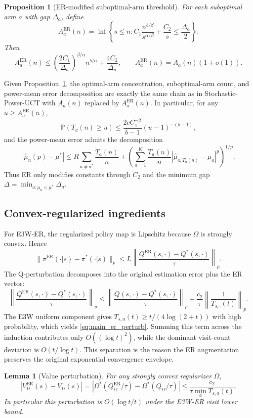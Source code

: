 \documentclass{article}
\newtheorem{lemma}[theorem]{Lemma}
\newtheorem{proposition}[theorem]{Proposition}
\newcommand{\Prob}{\mathbb{P}}
\newcommand{\muhat}{\widehat{\mu}}
\begin{document}
\begin{proposition}[ER-modified suboptimal-arm threshold]
\label{prop:main_threshold_statement}
For each suboptimal arm $a$ with gap $\Delta_a$, define
\[
A_a^{\mathrm{ER}}(n)=\inf\left\{s\leq n:C_1\frac{n^{b/\beta}}{s^{\alpha/\beta}}+\frac{C_2}{s}\leq\frac{\Delta_a}{2}\right\}.
\]
Then
\[
A_a^{\mathrm{ER}}(n)\leq \left(\frac{2C_1}{\Delta_a}\right)^{\beta/\alpha}n^{b/\alpha}+\frac{4C_2}{\Delta_a},
\qquad
A_a^{\mathrm{ER}}(n)=A_a(n)(1+o(1)).
\]
\end{proposition}

Given Proposition~\ref{prop:main_threshold_statement}, the optimal-arm concentration, suboptimal-arm count, and power-mean error decomposition are exactly the same chain as in Stochastic-Power-UCT with $A_a(n)$ replaced by $A_a^{\mathrm{ER}}(n)$.  In particular, for any $u\geq A_a^{\mathrm{ER}}(n)$,
\[
\Prob(T_a(n)\geq u)\leq \frac{2cC_1^{-\beta}}{b-1}(u-1)^{-(b-1)},
\]
and the power-mean error admits the decomposition
\[
|\muhat_n(p)-\mu^*|\leq R\sum_{a\neq a^*}\frac{T_a(n)}{n}
+\left(\sum_{a=1}^K\frac{T_a(n)}{n}|\muhat_{a,T_a(n)}-\mu_a|^p\right)^{1/p}.
\]
Thus ER only modifies constants through $C_2$ and the minimum gap $\Delta=\min_{a:\mu_a<\mu^*}\Delta_a$.

\subsection{Convex-regularized ingredients}
For E3W-ER, the regularized policy map is Lipschitz because $\Omega$ is strongly convex.  Hence
\[
\|\pi^{\mathrm{ER}}(\cdot|s)-\pi^*(\cdot|s)\|_p
\leq L\left\|\frac{Q^{\mathrm{ER}}(s,\cdot)-Q^*(s,\cdot)}{\tau}\right\|_p.
\]
The Q-perturbation decomposes into the original estimation error plus the ER vector:
\[
\left\|\frac{Q^{\mathrm{ER}}(s,\cdot)-Q^*(s,\cdot)}{\tau}\right\|_p
\leq \left\|\frac{Q(s,\cdot)-Q^*(s,\cdot)}{\tau}\right\|_p
+\frac{c_2}{\tau}\left\|\frac{1}{T_{s,\cdot}(t)}\right\|_p.
\]
The E3W uniform component gives $T_{s,a}(t)\geq t/(4\log(2+t))$ with high probability, which yields \eqref{eq:main_er_perturb}.  Summing this term across the induction contributes only $O((\log t)^2)$, while the dominant visit-count deviation is $O(t/\log t)$.  This separation is the reason the ER augmentation preserves the original exponential convergence envelope.

\begin{lemma}[Value perturbation]
\label{lem:main_value_perturb_statement}
For any strongly convex regularizer $\Omega$,
\[
|V_\Omega^{\mathrm{ER}}(s)-V_\Omega(s)|
=|\Omega^*(Q_\Omega^{\mathrm{ER}}/\tau)-\Omega^*(Q_\Omega/\tau)|
\leq \frac{c_2}{\tau\min_aT_{s,a}(t)}.
\]
In particular this perturbation is $O(\log t/t)$ under the E3W-ER visit lower bound.
\end{lemma}
\end{document}
